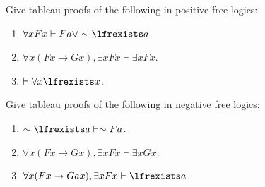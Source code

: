 \documentclass[../../../../include/open-logic-section]{subfiles}
\begin{document}


\begin{prob}
Give tableau proofs of the following in positive free logics:
\begin{enumerate}
\item $\forall xFx\vdash Fa\lor\sim \lfrexists a$.
\item $\forall x(Fx\rightarrow Gx),\exists xFx\vdash\exists xFx$.
\item $\vdash\forall x\lfrexists x$.
\end{enumerate}
\end{prob}

\begin{prob}
Give tableau proofs of the following in negative free logics:
\begin{enumerate}
\item $\sim \lfrexists a\vdash\sim Fa$.
\item $\forall x(Fx\rightarrow Gx),\exists xFx\vdash\exists xGx$.
\item $\forall x(Fx\rightarrow Gax),\exists xFx\vdash \lfrexists a$.
\end{enumerate}
\end{prob}
\end{document}
